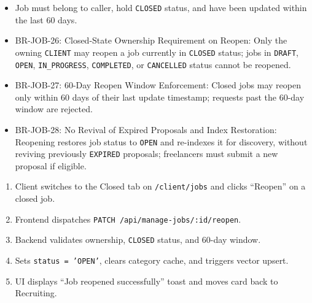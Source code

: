 \begin{itemize}[leftmargin=1.6em,topsep=3pt,itemsep=2pt,parsep=0pt,label=$\bullet$]
    \item Job must belong to caller, hold \texttt{CLOSED} status, and have been updated within the last 60 days.
\end{itemize}

\begin{itemize}[leftmargin=1.6em,topsep=3pt,itemsep=2pt,parsep=0pt,label=$\bullet$]\brrulelist
    \item BR-JOB-26: Closed-State Ownership Requirement on Reopen: Only the owning \texttt{CLIENT} may reopen a job currently in \texttt{CLOSED} status; jobs in \texttt{DRAFT}, \texttt{OPEN}, \texttt{IN\_PROGRESS}, \texttt{COMPLETED}, or \texttt{CANCELLED} status cannot be reopened.
    \item BR-JOB-27: 60-Day Reopen Window Enforcement: Closed jobs may reopen only within 60 days of their last update timestamp; requests past the 60-day window are rejected.
    \item BR-JOB-28: No Revival of Expired Proposals and Index Restoration: Reopening restores job status to \texttt{OPEN} and re-indexes it for discovery, without reviving previously \texttt{EXPIRED} proposals; freelancers must submit a new proposal if eligible.
\end{itemize}

\begin{enumerate}[leftmargin=1.8em,topsep=3pt,itemsep=2pt,parsep=0pt]
    \item Client switches to the Closed tab on \texttt{/client/jobs} and clicks ``Reopen'' on a closed job.
    \item Frontend dispatches \texttt{PATCH /api/manage-jobs/:id/reopen}.
    \item Backend validates ownership, \texttt{CLOSED} status, and 60-day window.
    \item Sets \texttt{status = 'OPEN'}, clears category cache, and triggers vector upsert.
    \item UI displays ``Job reopened successfully'' toast and moves card back to Recruiting.
\end{enumerate}

